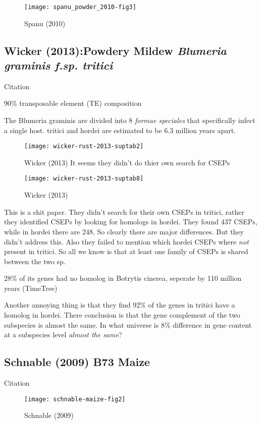   \begin{figure}[h!] \centering
    \texttt{[image: spanu\_powder\_2010-fig3]}
    \caption{Spanu (2010) \cite{spanu_genome_2010}}
  \end{figure}
  \FloatBarrier

\subsection{Wicker (2013):Powdery Mildew \textit{ Blumeria graminis f.sp. tritici}}

  Citation \cite{wicker_wheat_2013}

  90\% transposable element (TE) composition

  The Blumeria graminis are divided into 8 \textit{formae speciales} that
  specifically infect a single host. tritici and hordei are estimated to be
  6.3 million years apart. 

  \begin{figure}[h!] \centering
    \texttt{[image: wicker-rust-2013-suptab2]}
    \caption{Wicker (2013) \cite{wicker_wheat_2013} It seems they didn't do thier own search for CSEPs}
  \end{figure}
  \FloatBarrier

  \begin{figure}[h!] \centering
    \texttt{[image: wicker-rust-2013-suptab8]}
    \caption{Wicker (2013) \cite{wicker_wheat_2013} }
  \end{figure}
  \FloatBarrier

  This is a shit paper. They didn't search for their own CSEPs in tritici,
  rather they identified CSEPs by looking for homologs in hordei.  They found
  437 CSEPs, while in hordei there are 248. So clearly there are major
  differences. But they didn't address this. Also they failed to mention
  which hordei CSEPs where \textit{not} present in tritici. So all we know is
  that at least one family of CSEPs is shared between the two sp.

  28\% of its genes had no homolog in Botrytis cinerea, seperate by 110 million years (TimeTree)

  Another annoying thing is that they find 92\% of the genes in tritici have
  a homolog in hordei. There conclusion is that the gene complement of the
  two subspecies is almost the same. In what universe is 8\% difference in
  gene content at a subspecies level \textit{almost the same}?

\subsection{Schnable (2009) B73 Maize}
  Citation \cite{schnable_b73_2009}

  \begin{figure}[h!] \centering
    \texttt{[image: schnable-maize-fig2]}
    \caption{Schnable (2009) \cite{schnable_b73_2009}}
  \end{figure}
  \FloatBarrier
